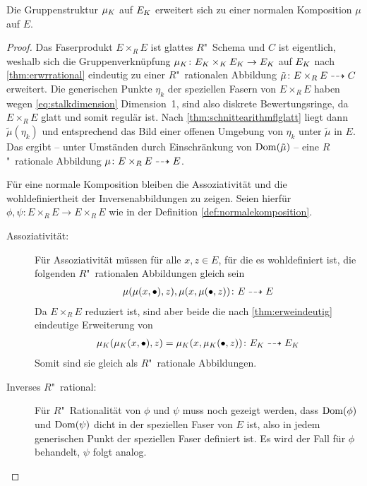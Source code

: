 \begin{Lemma}
  Die Gruppenstruktur $\mu_{K}$ auf $E_{K}$ erweitert sich zu einer
  normalen Komposition $\mu$ auf $E$.
  \begin{proof}
    Das Faserprodukt $E\times_R E$ ist glattes $R$"~Schema und $C$ ist
    eigentlich, weshalb sich die Gruppenverknüpfung
    ${\mu_{K}\colon E_{K}\times_{K} E_{K}\to E_{K}}$ auf $E_{K}$ nach
    \ref{thm:erwrrational} eindeutig zu einer $R$"~rationalen
    Abbildung $\tilde\mu\colon E\times_R E\dashrightarrow C$ erweitert.
    Die generischen Punkte $\eta_k$ der speziellen Fasern von
    $E\times_R E$ haben wegen \autoref{eq:stalkdimension}
    Dimension~1, sind also diskrete Bewertungsringe, da
    $E\times_R E$ glatt und somit regulär ist. Nach
    \ref{thm:schnittearithmflglatt} liegt dann
    $\tilde\mu(\eta_k)$ und entsprechend das Bild einer offenen
    Umgebung von $\eta_k$ unter $\tilde\mu$ in $E$. Das ergibt
    – unter Umständen durch Einschränkung von $\operatorname{Dom}(\tilde\mu)$ –
    eine $R$"~rationale Abbildung ${\mu\colon E\times_R E\dashrightarrow E}$.

    Für eine normale Komposition bleiben die Assoziativität und
    die wohldefiniertheit der Inversenabbildungen zu zeigen. Seien
    hierfür ${\phi,\psi\colon E\times_R E\to E\times_R E}$ 
    wie in der Definition \ref{def:normalekomposition}.

    \begin{description}
    \item[Assoziativität:]
      Für Assoziativität müssen für alle $x, {z\in E}$, für die es
      wohldefiniert ist, die folgenden $R$"~rationalen 
      Abbildungen gleich sein
      \begin{gather*}
        \mu(\mu(x,\bullet),z), \mu(x,\mu(\bullet,z))
        \colon E \dashrightarrow E
      \end{gather*}
      Da $E\times_R E$ reduziert ist, sind aber beide die nach
      \ref{thm:erweindeutig} eindeutige Erweiterung von
      \begin{gather*}
        \mu_{K}(\mu_{K}(x,\bullet),z)=\mu_{K}(x,\mu_{K}(\bullet,z))
        \colon E_{K} \dashrightarrow E_{K}
      \end{gather*}
      Somit sind sie gleich als $R$"~rationale Abbildungen.
      
    \item[Inverses $R$"~rational:]
      Für $R$"~Rationalität von $\phi$ und $\psi$ muss noch gezeigt
      werden, dass $\operatorname{Dom}(\phi)$ und $\operatorname{Dom}(\psi)$ dicht in der
      speziellen Faser von $E$ ist, also in jedem generischen Punkt
      der speziellen Faser definiert ist.
      Es wird der Fall für $\phi$ behandelt, $\psi$ folgt analog.
      

\end{description}
\end{proof}
\end{Lemma}
